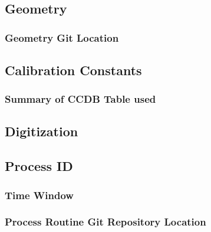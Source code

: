 \section{}

\subsection{Geometry}

\subsubsection{Geometry Git Location}

\subsection{Calibration Constants}

\subsubsection{Summary of CCDB Table used}

\subsection{Digitization}

\subsection{Process ID}

\subsubsection{Time Window}

\subsubsection{Process Routine Git Repository Location}


